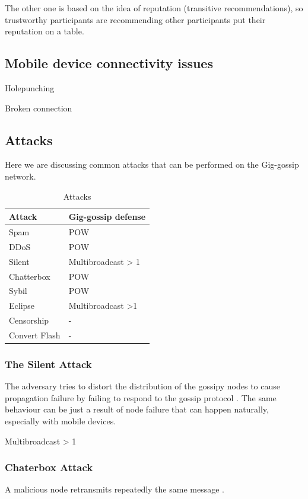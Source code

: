 \documentclass{article}
\begin{document}
The other one is based on the idea of reputation (transitive recommendations), so trustworthy participants are recommending other participants put their reputation on a table.

\subsection{Mobile device connectivity issues}

Holepunching \cite{HolePunching}

Broken connection

\subsection{Attacks}
Here we are discussing common attacks that can be performed on the Gig-gossip network.


\begin{table}  
	\centering
	\begin{tabular}{ll}
		\toprule
		Attack         & Gig-gossip defense \\
		\midrule
		Spam           & POW \\
		DDoS           & POW \\
		Silent         & Multibroadcast > 1 \\
		Chatterbox     & POW \\
		Sybil          & POW \\
		Eclipse        & Multibroadcast >1 \\
		Censorship     & - \\
		Convert Flash  & - \\
		\bottomrule
	\end{tabular}
	\label{tab:attacks}
	\caption{Attacks}
\end{table}


\subsubsection{The Silent Attack}
The adversary tries to distort the distribution of the gossipy nodes to cause propagation failure by failing to respond to the gossip protocol \cite{AdHocNet}. The same behaviour can be just a result of node failure that can happen naturally, especially with mobile devices.

Multibroadcast > 1


\subsubsection{Chaterbox Attack}
A malicious node retransmits repeatedly the same message \cite{AdHocNet}.
\end{document}
